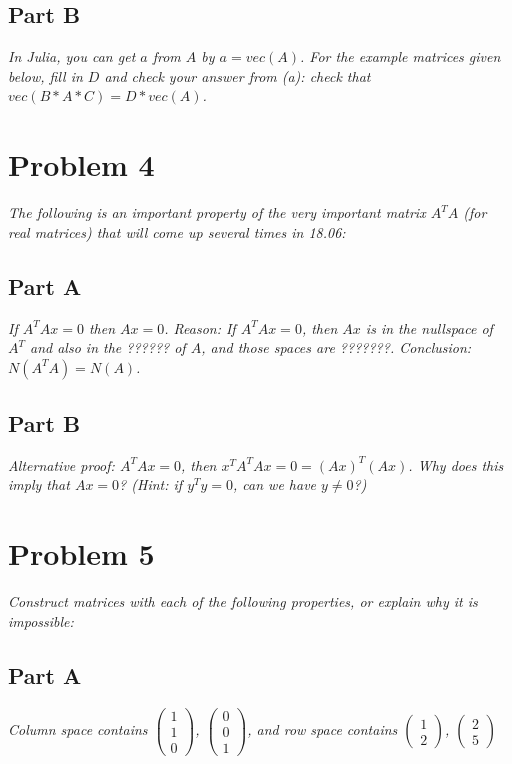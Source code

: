 \documentclass{article}
\begin{document}
\subsection*{Part B}

\textit{In Julia, you can get $a$ from $A$ by $a = vec(A)$. For the example
matrices given below, fill in $D$ and check your answer from (a): check that
$vec(B*A*C) = D*vec(A)$.}

\section*{Problem 4}

\textit{The following is an important property of the very important matrix
$A^T A$ (for real matrices) that will come up several times in 18.06:}

\subsection*{Part A}

\textit{If $A^TAx=0$ then $Ax=0$. Reason: If $A^TAx=0$, then $Ax$ is in the
nullspace of $A^T$ and also in the ?????? of $A$, and those spaces are
???????. Conclusion: $N(A^T A) = N(A)$.}

\subsection*{Part B}

\textit{Alternative proof: $A^TAx=0$, then $x^T A^T Ax = 0 = (Ax)^T (Ax)$.
Why does this imply that $Ax=0$? (Hint: if $y^Ty = 0$, can we have $y\ne
0$?)}

\section*{Problem 5}

\textit{Construct matrices with each of the following properties, or explain
why it is impossible:}

\subsection*{Part A}

\textit{Column space contains $\begin{pmatrix} 1\\1\\0 \end{pmatrix}$,
$\begin{pmatrix} 0\\0\\1 \end{pmatrix}$, and row space contains
$\begin{pmatrix} 1\\2 \end{pmatrix}$, $\begin{pmatrix} 2 \\5 \end{pmatrix}$}
\end{document}
